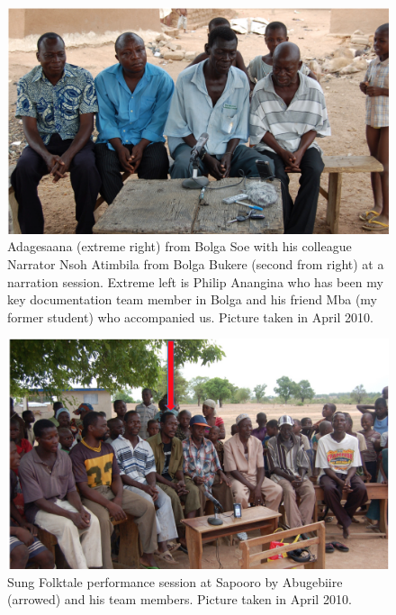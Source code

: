 \documentclass[output=paper,colorlinks,citecolor=brown]{langscibook}
\begin{document}
\begin{figure}
\includegraphics[scale=0.55]{../figures/adagesaana.png}
\caption{Adagesaana (extreme right) from Bolga Soe with his colleague Narrator Nsoh Atimbila from Bolga 
 	  Bukere (second from right) at a narration session. Extreme left is Philip Anangina who has been my 
 	key documentation team member in Bolga and his friend Mba (my former student) who
 	 accompanied us. Picture taken in April 2010.}

\end{figure}


\begin{figure}
\includegraphics[scale=0.55]{../figures/abugebiire.png}
\caption{Sung Folktale performance session at Sapooro by Abugebiire (arrowed) and his team members. Picture taken in April 2010.
}

\end{figure}
\end{document}
